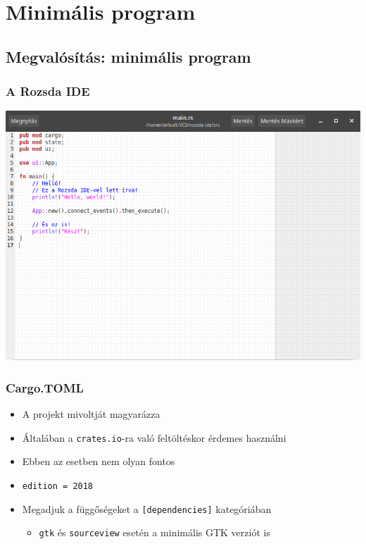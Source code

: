 \documentclass{beamer}
\begin{document}
    \section{Minimális program}

    \subsection{Megvalósítás: minimális program}

    \begin{frame}[fragile]
        \frametitle{A Rozsda IDE}

        \begin{center}
            \includegraphics[scale=0.3]{kepek/mvp.png}
        \end{center}
    \end{frame}

    \begin{frame}[fragile]
        \frametitle{Cargo.TOML}

        \begin{itemize}
            \item A projekt mivoltját magyarázza
            \item Általában a \texttt{crates.io}-ra való feltöltéskor érdemes használni
            \item Ebben az esetben nem olyan fontos
            \item \texttt{edition = 2018}
            \item Megadjuk a függőségeket a \texttt{[dependencies]} kategóriában \begin{itemize}
                \item \texttt{gtk} és \texttt{sourceview} esetén a minimális GTK verziót is
            \end{itemize}
        \end{itemize}
    \end{frame}
\end{document}

